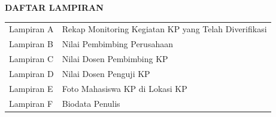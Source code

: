 \cleardoublepage
{}
{}
\begin{center}
  {\FontJudulHalaman\bfseries DAFTAR LAMPIRAN\par}
\end{center}
\vspace{12pt}

\noindent
\begin{tabularx}{\linewidth}{@{}l X@{}}
  Lampiran A & Rekap Monitoring Kegiatan KP yang Telah Diverifikasi \\
  Lampiran B & Nilai Pembimbing Perusahaan \\
  Lampiran C & Nilai Dosen Pembimbing KP \\
  Lampiran D & Nilai Dosen Penguji KP \\
  Lampiran E & Foto Mahasiswa KP di Lokasi KP \\
  Lampiran F & Biodata Penulis \\
\end{tabularx}
